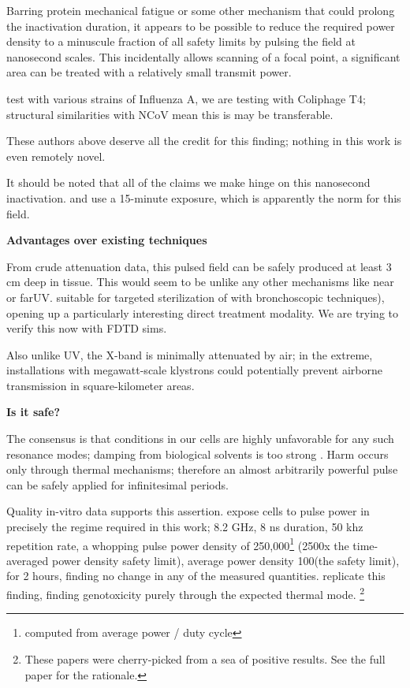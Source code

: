 \documentclass[fleqn,10pt]{paper}
\begin{document}
Barring protein mechanical fatigue \cite{Mechanical2013} or some other mechanism that could prolong the inactivation duration, it appears to be possible to reduce the required power density to a minuscule fraction of all safety limits by pulsing the field at nanosecond scales. This incidentally allows scanning of a focal point, a significant area can be treated with a relatively small transmit power.

\cite{Efficient2015} test with various strains of Influenza A, we are testing with Coliphage T4; structural similarities with NCoV mean this is may be transferable. 

These authors above deserve all the credit for this finding; nothing in this work is even remotely novel.

\begin{autem}
	It should be noted that all of the claims we make hinge on this nanosecond inactivation. \cite{Efficient2015} and \cite{focusing2014} use a 15-minute exposure, which is apparently the norm for this field. 
\end{autem}

{\Large \textbf{Advantages over existing techniques}}

From crude attenuation data, this pulsed field can be safely produced at least 3 cm deep in tissue. This would seem to be unlike any other mechanisms like near or far\cite{Germicidal2017}UV. suitable for targeted sterilization of with bronchoscopic techniques), opening up a particularly interesting direct treatment modality. We are trying to verify this now with FDTD sims.

Also unlike UV, the X-band is minimally attenuated by air; in the extreme, installations with megawatt-scale klystrons could potentially prevent airborne transmission in square-kilometer areas.

{\Large \textbf{Is it safe?}}

The consensus is that conditions in our cells are highly unfavorable for any such resonance modes; damping from biological solvents is too strong \cite{Vibrational2002}. Harm occurs only through thermal mechanisms; therefore an almost arbitrarily powerful pulse can be safely applied for infinitesimal periods.

Quality in-vitro data supports this assertion. \cite{Cytogenetic2006} expose cells to pulse power in precisely the regime required in this work; 8.2 GHz, 8 ns duration, 50 khz repetition rate, a whopping pulse power density of 250,000\Wsqm\footnote{computed from average power / duty cycle} (2500x the time-averaged power density safety limit), average power density 100\Wsqm (the safety limit), for 2 hours, finding no change in any of the measured quantities. \cite{DNA2004} replicate this finding, finding genotoxicity purely through the expected thermal mode. \footnote{These papers were cherry-picked from a sea of positive results. See the full paper for the rationale.}
\end{document}
